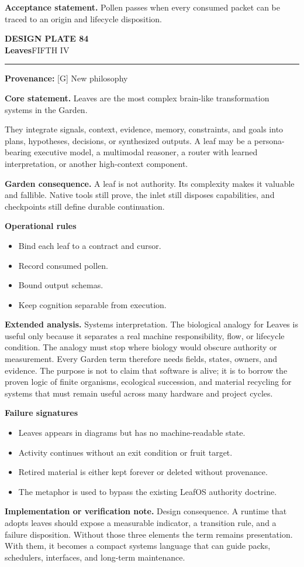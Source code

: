 \documentclass[10pt,letterpaper,oneside]{article}
\newcommand{\prov}[1]{\textcolor{gardenBlue}{\sffamily\footnotesize\textbf{Provenance:} #1}}
\newcommand{\platetitle}[3]{%
  \begin{minipage}[t][0.54in][t]{\textwidth}
  {\sffamily\bfseries\color{gardenDeep}\fontsize{9}{10}\selectfont DESIGN PLATE #1}\\[-1pt]
  {\sffamily\bfseries\color{gardenInk}\fontsize{16.5}{18}\selectfont #2}\hfill{\sffamily\color{gardenGreen}\large #3}
  \end{minipage}\vspace{-2pt}\hrule\vspace{5pt}}
\begin{document}
\begin{acceptbox}
\textbf{Acceptance statement.} Pollen passes when every consumed packet can be traced to an origin and lifecycle disposition.
\end{acceptbox}
\newpage
\platetitle{84}{Leaves}{FIFTH IV}
\prov{[G] New philosophy}
\fontsize{8.85}{10.45}\selectfont
\begin{corebox}
\textbf{Core statement.} Leaves are the most complex brain-like transformation systems in the Garden.
\end{corebox}
They integrate signals, context, evidence, memory, constraints, and goals into plans, hypotheses, decisions, or synthesized outputs. A leaf may be a persona-bearing executive model, a multimodal reasoner, a router with learned interpretation, or another high-context component.

\textbf{Garden consequence.} A leaf is not authority. Its complexity makes it valuable and fallible. Native tools still prove, the inlet still disposes capabilities, and checkpoints still define durable continuation.

\textbf{Operational rules}
\begin{itemize}
\item Bind each leaf to a contract and cursor.
\item Record consumed pollen.
\item Bound output schemas.
\item Keep cognition separable from execution.
\end{itemize}
\textbf{Extended analysis.} Systems interpretation. The biological analogy for Leaves is useful only because it separates a real machine responsibility, flow, or lifecycle condition. The analogy must stop where biology would obscure authority or measurement. Every Garden term therefore needs fields, states, owners, and evidence. The purpose is not to claim that software is alive; it is to borrow the proven logic of finite organisms, ecological succession, and material recycling for systems that must remain useful across many hardware and project cycles.

\textbf{Failure signatures}
\begin{itemize}
\item Leaves appears in diagrams but has no machine-readable state.
\item Activity continues without an exit condition or fruit target.
\item Retired material is either kept forever or deleted without provenance.
\item The metaphor is used to bypass the existing LeafOS authority doctrine.
\end{itemize}
\textbf{Implementation or verification note.} Design consequence. A runtime that adopts leaves should expose a measurable indicator, a transition rule, and a failure disposition. Without those three elements the term remains presentation. With them, it becomes a compact systems language that can guide packs, schedulers, interfaces, and long-term maintenance.
\end{document}
